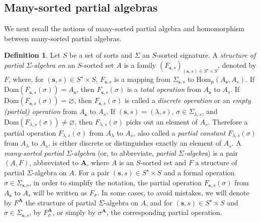 \documentclass[a4paper, reqno
]{amsart}
\newcommand{\Dom}{\mathrm{Dom}}
\theoremstyle{plain}
\theoremstyle{definition}
\newtheorem{definition}[theorem]{Definition}
\begin{document}
\subsection{Many-sorted partial algebras}\label{SPartialAlg}

We next recall the notions of many-sorted partial algebra and homomorphism between many-sorted partial algebras.

\begin{definition}\label{DPartialAlg}
Let $S$ be a set of sorts and $\Sigma$ an $S$-sorted signature.
A \emph{structure of partial} $\Sigma$-\emph{algebra on} an $S$-sorted set $A$ is a family $(F_{\mathbf{s},s})_{(\mathbf{s},s)\in S^{\star}\times S}$, denoted by $F$, where, for $(\mathbf{s},s)\in S^{\star}\times S$, $F_{\mathbf{s},s}$ is a mapping from $\Sigma_{\mathbf{s},s}$ to $\mathrm{Hom}_{\mathrm{p}}(A_{\mathbf{s}},A_{s})$.
If $\Dom(F_{\mathbf{s},s}(\sigma)) = A_{\mathbf{s}}$, then $F_{\mathbf{s},s}(\sigma)$ is a \emph{total operation} from $A_{\mathbf{s}}$ to $A_{s}$.
If $\Dom(F_{\mathbf{s},s}(\sigma)) = \varnothing$, then $F_{\mathbf{s},s}(\sigma)$ is called a \emph{discrete operation} or an \emph{empty (partial) operation} from $A_{\mathbf{s}}$ to $A_{s}$.
If $(\mathbf{s},s) = (\lambda,s)$, $\sigma\in \Sigma_{\lambda,s}$, and $\Dom(F_{\lambda,s}(\sigma))\neq\varnothing$, then $F_{\lambda,s}(\sigma)$ picks out an element of $A_{s}$.
Therefore a partial operation $F_{\lambda,s}(\sigma)$ from $A_{\lambda}$ to $A_{s}$, also called a \emph{partial constant} $F_{\lambda,s}(\sigma)$ from $A_{\lambda}$ to $A_{s}$, is either discrete or distinguishes exactly an element of $A_{s}$.
A \emph{many-sorted partial} $\Sigma$-\emph{algebra} (or, to abbreviate, \emph{partial $\Sigma$-algebra}) is a pair $(A,F)$, abbreviated to $\mathbf{A}$, where $A$ is an $S$-sorted set and $F$ a structure of partial $\Sigma$-algebra on $A$.
For a pair $(\mathbf{s},s)\in S^{\star}\times S$ and a formal operation $\sigma\in \Sigma_{\mathbf{s},s}$, in order to simplify the notation, the partial operation $F_{\mathbf{s},s}(\sigma)$ from $A_{\mathbf{s}}$ to $A_{s}$ will be written as $F_{\sigma}$.
In some cases, to avoid mistakes, we will denote by $F^{\mathbf{A}}$ the structure of partial $\Sigma$-algebra on $A$, and for $(\mathbf{s},s)\in S^{\star}\times S$ and $\sigma\in \Sigma_{\mathbf{s},s}$, by $F^{\mathbf{A}}_{\sigma}$, or simply by $\sigma^{\mathbf{A}}$, the corresponding partial operation.


\end{definition}
\end{document}
